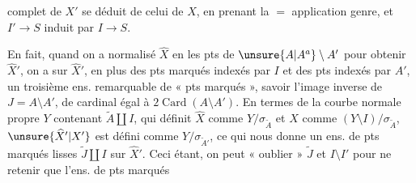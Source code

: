 complet de $X'$ se déduit de celui de $X$, en prenant la $=$ application genre, et $I'\longrightarrow S$ induit par $I\longrightarrow S$.

En fait, quand on a normalisé $\widehat X$ en les pts de $\unsure{A|A^{a}}\setminus A'$ pour obtenir $\widehat X'$, on a sur $\widehat X'$, en plus des pts marqués indexés par $I$ et des pts  indexés par $A'$, un troisième ens. remarquable de « pts marqués », savoir l'image inverse  de $J=A\setminus A'$,  de cardinal égal à $2\operatorname{Card}(A\setminus A')$. En termes de la courbe normale propre $Y$  contenant $\widetilde A\amalg I$, qui définit $\widehat X$ comme $Y/\sigma_{\widetilde A}$ et $X$ comme $(Y\setminus I)/\sigma_{\widetilde A}$, $\unsure{\widehat X'|X'}$ est défini comme $Y/\sigma_{\widetilde A'}$, ce qui nous donne un ens. de pts marqués lisses  $\widetilde J\amalg I$ sur $\widehat X'$. Ceci étant, on peut « oublier » $\widetilde J$ et $I\setminus I'$ pour ne retenir que l'ens. de pts marqués
